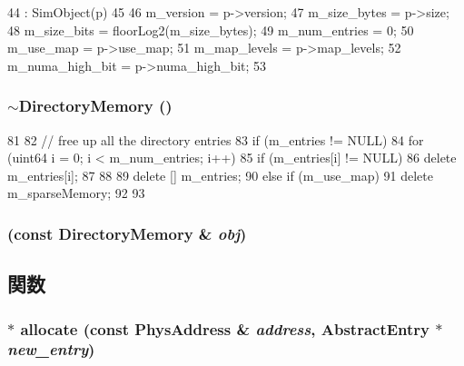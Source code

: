 \begin{DoxyCode}
44     : SimObject(p)
45 {
46     m_version = p->version;
47     m_size_bytes = p->size;
48     m_size_bits = floorLog2(m_size_bytes);
49     m_num_entries = 0;
50     m_use_map = p->use_map;
51     m_map_levels = p->map_levels;
52     m_numa_high_bit = p->numa_high_bit;
53 }
\end{DoxyCode}
\hypertarget{classDirectoryMemory_a795a78e7307578d71722e1e697abbd28}{
\subsubsection[{$\sim$DirectoryMemory}]{\setlength{\rightskip}{0pt plus 5cm}$\sim${\bf DirectoryMemory} ()}}
\label{classDirectoryMemory_a795a78e7307578d71722e1e697abbd28}



\begin{DoxyCode}
81 {
82     // free up all the directory entries
83     if (m_entries != NULL) {
84         for (uint64 i = 0; i < m_num_entries; i++) {
85             if (m_entries[i] != NULL) {
86                 delete m_entries[i];
87             }
88         }
89         delete [] m_entries;
90     } else if (m_use_map) {
91         delete m_sparseMemory;
92     }
93 }
\end{DoxyCode}
\hypertarget{classDirectoryMemory_ae2327b46bc88514a99866373c87dfbdf}{
\subsubsection[{DirectoryMemory}]{ (const {\bf DirectoryMemory} \& {\em obj})}}
\label{classDirectoryMemory_ae2327b46bc88514a99866373c87dfbdf}


\subsection{関数}
\hypertarget{classDirectoryMemory_aee033a35679976b4a82111c30bef7891}{
\subsubsection[{allocate}]{ $\ast$ allocate (const {\bf PhysAddress} \& {\em address}, \/  {\bf AbstractEntry} $\ast$ {\em new\_\-entry})}}
\label{classDirectoryMemory_aee033a35679976b4a82111c30bef7891}



